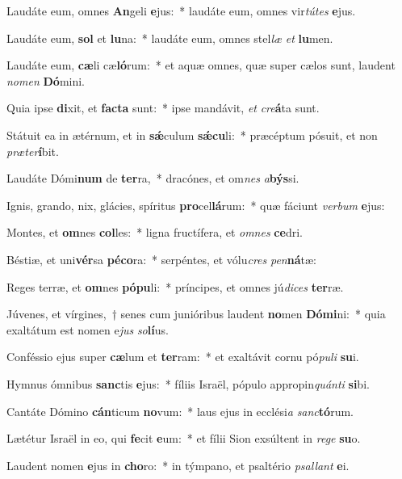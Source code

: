 \item Laudáte eum, omnes \textbf{An}geli \textbf{e}jus:~* laudáte eum, omnes vir\textit{tú}\textit{tes} \textbf{e}jus.
\item Laudáte eum, \textbf{sol} et \textbf{lu}na:~* laudáte eum, omnes stel\textit{læ} \textit{et} \textbf{lu}men.
\item Laudáte eum, \textbf{cæ}li cæ\textbf{ló}rum:~* et aquæ omnes, quæ super cælos sunt, laudent \textit{no}\textit{men} \textbf{Dó}mini.
\item Quia ipse \textbf{di}xit, et \textbf{fac}\textbf{ta} sunt:~* ipse mandávit, \textit{et} \textit{cre}\textbf{á}ta sunt.
\item Státuit ea in ætérnum, et in \textbf{sǽ}culum \textbf{sǽ}\textbf{cu}li:~* præcéptum pósuit, et non \textit{præ}\textit{ter}\textbf{í}bit.
\item Laudáte Dómi\textbf{num} de \textbf{ter}ra,~* dracónes, et om\textit{nes} \textit{a}\textbf{býs}si.
\item Ignis, grando, nix, glácies, spíritus \textbf{pro}cel\textbf{lá}rum:~* quæ fáciunt \textit{ver}\textit{bum} \textbf{e}jus:
\item Montes, et \textbf{om}nes \textbf{col}les:~* ligna fructífera, et \textit{om}\textit{nes} \textbf{ce}dri.
\item Béstiæ, et uni\textbf{vér}sa \textbf{pé}\textbf{co}ra:~* serpéntes, et vólu\textit{cres} \textit{pen}\textbf{ná}tæ:
\item Reges terræ, et \textbf{om}nes \textbf{pó}\textbf{pu}li:~* príncipes, et omnes jú\textit{di}\textit{ces} \textbf{ter}ræ.
\item Júvenes, et vírgines,~† senes cum junióribus laudent \textbf{no}men \textbf{Dó}\textbf{mi}ni:~* quia exaltátum est nomen e\textit{jus} \textit{so}\textbf{lí}us.
\item Conféssio ejus super \textbf{cæ}lum et \textbf{ter}ram:~* et exaltávit cornu pó\textit{pu}\textit{li} \textbf{su}i.
\item Hymnus ómnibus \textbf{sanc}tis \textbf{e}jus:~* fíliis Israël, pópulo appropin\textit{quán}\textit{ti} \textbf{si}bi.
\item Cantáte Dómino \textbf{cán}ticum \textbf{no}vum:~* laus ejus in ecclési\textit{a} \textit{sanc}\textbf{tó}rum.
\item Lætétur Israël in eo, qui \textbf{fe}cit \textbf{e}um:~* et fílii Sion exsúltent in \textit{re}\textit{ge} \textbf{su}o.
\item Laudent nomen \textbf{e}jus in \textbf{cho}ro:~* in týmpano, et psaltério \textit{psal}\textit{lant} \textbf{e}i.
